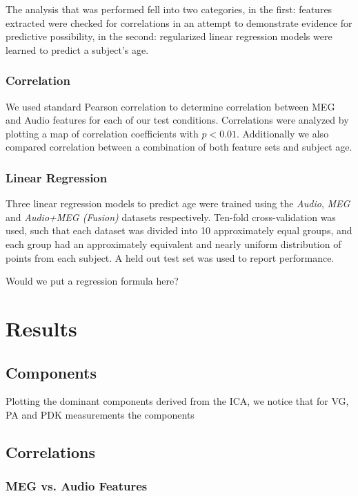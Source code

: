 \documentclass[a4paper]{article}
\begin{document}
The analysis that was performed fell into two categories, in the first: features extracted were checked for correlations in an attempt to demonstrate evidence for predictive possibility, in the second: regularized linear regression models were learned to predict a subject's age.

\subsubsection{Correlation}

We used standard Pearson correlation to determine correlation between MEG and Audio features for each of our test conditions. Correlations were analyzed by plotting a map of correlation coefficients with $p < 0.01$. Additionally we also compared correlation between a combination of both feature sets and subject age.

\subsubsection{Linear Regression}

Three linear regression models to predict age were trained using the \textit{Audio}, \textit{MEG} and \textit{Audio+MEG (Fusion)} datasets respectively. Ten-fold cross-validation was used, such that each dataset was divided into 10 approximately equal groups, and each group had an approximately equivalent and nearly uniform distribution of points from each subject. A held out test set was used to report performance.

Would we put a regression formula here?

\section{Results}

\subsection{Components}

Plotting the dominant components derived from the ICA, we notice that for VG, PA and PDK measurements the components

\subsection{Correlations}

\subsubsection{MEG vs. Audio Features}
\end{document}
